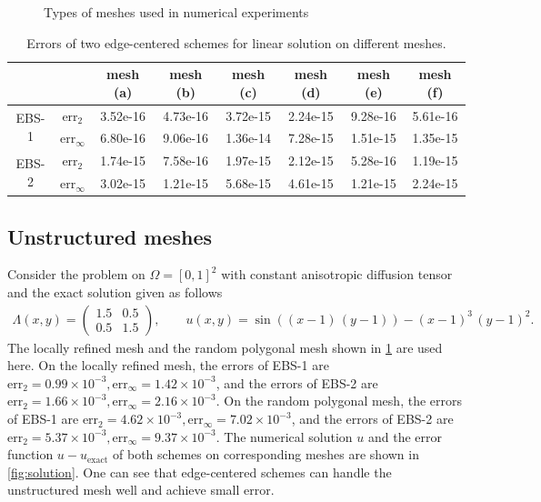 \documentclass[times,review,preprint,authoryear]{elsarticle}
\begin{document}
\begin{figure}[h]
\caption{Types of meshes used in numerical experiments}
\label{fig:mesh}
\end{figure}

\begin{table}[h]
\centering
\begin{tabular}{cccccccc}
\hline
& & mesh (a) & mesh (b) & mesh (c) & mesh (d) & mesh (e) & mesh (f) \\
\hline
\multirow{2}{*}{EBS-1} & $\text{err}_{2}$ & 3.52e-16 & 4.73e-16 & 3.72e-15 & 2.24e-15 & 9.28e-16 & 5.61e-16 \\
& $\text{err}_{\infty}$ & 6.80e-16 & 9.06e-16 & 1.36e-14 & 7.28e-15 & 1.51e-15 & 1.35e-15 \\
\hline
\multirow{2}{*}{EBS-2} & $\text{err}_{2}$ & 1.74e-15 & 7.58e-16 & 1.97e-15 & 2.12e-15 & 5.28e-16 & 1.19e-15 \\
& $\text{err}_{\infty}$ & 3.02e-15 & 1.21e-15 & 5.68e-15 & 4.61e-15 & 1.21e-15 & 2.24e-15 \\
\hline
\end{tabular}
\caption{Errors of two edge-centered schemes for linear solution on different meshes.}
\label{tab:linear}
\end{table}

\subsection{Unstructured meshes}

Consider the problem on $\Omega = [0,1]^2$ with constant anisotropic diffusion tensor and the exact solution given as follows
\begin{align*}
\Lambda(x,y) =
\left(
\begin{matrix}
1.5 & 0.5 \\
0.5 & 1.5
\end{matrix}
\right),
\qquad
u(x,y) = \sin((x-1) \, (y-1)) - (x-1)^3 \, (y-1)^2.
\end{align*}
The locally refined mesh and the random polygonal mesh shown in \cref{fig:mesh} are used here. On the locally refined mesh, the errors of EBS-1 are $\text{err}_2 = 0.99 \times 10^{-3}, \text{err}_\infty = 1.42 \times 10^{-3}$, and the errors of EBS-2 are $\text{err}_2 = 1.66 \times 10^{-3}, \text{err}_\infty = 2.16 \times 10^{-3}$. On the random polygonal mesh, the errors of EBS-1 are $\text{err}_2 = 4.62 \times 10^{-3}, \text{err}_\infty = 7.02 \times 10^{-3}$, and the errors of EBS-2 are $\text{err}_2 = 5.37 \times 10^{-3}, \text{err}_\infty = 9.37 \times 10^{-3}$.
The numerical solution $u$ and the error function $u - u_{\text{exact}}$ of both schemes on corresponding meshes are shown in \cref{fig:solution}. 
One can see that edge-centered schemes can handle the unstructured mesh well and achieve small error.
\end{document}
